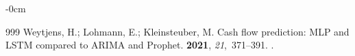 \documentclass[energies,article,accept,pdftex,moreauthors]{Definitions/mdpi}
\begin{document}
\begin{adjustwidth}{-\extralength}{0cm}
\begin{thebibliography}{999}
Weytjens, H.; Lohmann, E.; Kleinsteuber, M.
\newblock Cash flow prediction: MLP and LSTM compared to ARIMA and Prophet.
 {\bf 2021}, {\em 21},~371--391.
.

\end{thebibliography}



%

\PublishersNote{}
\end{adjustwidth}
\end{document}
